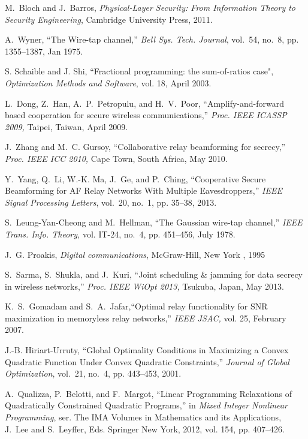\documentclass[journal,,draftclsnofoot letterpaper, onecolumn]{IEEEtran}
\begin{document}
\begin{thebibliography}{99}
 M.~Bloch and J.~Barros, \textit{Physical-Layer Security: From Information Theory to Security Engineering}, Cambridge University Press, 2011.

 A.~Wyner, ``The Wire-tap channel,'' \textit{Bell Sys. Tech. Journal}, vol.~54, no.~8, pp. 1355--1387, Jan 1975.

 S. Schaible and J. Shi, ``Fractional programming: the sum-of-ratios case", \textit{Optimization Methods and Software}, vol. 18, April 2003.

 L.~Dong, Z.~Han, A.~P.~Petropulu, and H.~V.~Poor, ``Amplify-and-forward based cooperation for secure wireless communications,'' \textit{Proc. IEEE ICASSP 2009,} Taipei, Taiwan, April 2009.

 J.~Zhang and M.~C. Gursoy, ``Collaborative relay beamforming for secrecy,'' \textit{Proc. IEEE ICC 2010,} Cape Town, South Africa, May 2010.

Y.~Yang, Q.~Li, W.-K. Ma, J.~Ge, and P.~Ching, ``{Cooperative Secure
  Beamforming for AF Relay Networks With Multiple Eavesdroppers},'' \textit{IEEE
  Signal Processing Letters}, vol.~20, no.~1, pp. 35--38, 2013.

 S.~Leung-Yan-Cheong and M.~Hellman, ``The Gaussian wire-tap channel,'' \textit{IEEE Trans. Info. Theory,} vol. IT-24, no.~4, pp. 451--456, July 1978.

 J.~G. Proakis, \textit{Digital communications}, McGraw-Hill, New York , 1995
  
 S.~Sarma, S.~Shukla, and J.~Kuri, ``Joint scheduling \& jamming for data secrecy in wireless networks,'' \textit{Proc. IEEE WiOpt 2013,} Tsukuba, Japan, May 2013.

 K.~S.~Gomadam and S.~A.~Jafar,``Optimal relay functionality for SNR maximization in memoryless relay networks,'' \textit{IEEE JSAC,} vol. 25, February 2007.

J.-B. Hiriart-Urruty, ``{Global Optimality Conditions in Maximizing a Convex
  Quadratic Function Under Convex Quadratic Constraints},'' \emph{Journal of
  Global Optimization}, vol.~21, no.~4, pp. 443--453, 2001.

 A.~Qualizza, P.~Belotti, and F.~Margot, ``Linear Programming Relaxations of Quadratically Constrained Quadratic Programs,'' in \textit{Mixed Integer Nonlinear Programming}, ser. The IMA Volumes in Mathematics and its Applications, J.~Lee and S.~Leyffer, Eds. Springer New York, 2012, vol. 154, pp. 407--426.


\end{thebibliography}
\end{document}
